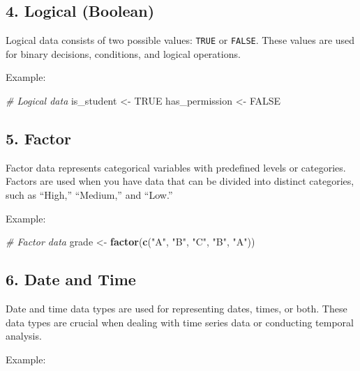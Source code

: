 \documentclass[
]{book}
\newenvironment{Shaded}{\begin{snugshade}}{\end{snugshade}}
\newcommand{\CommentTok}[1]{\textcolor[rgb]{0.56,0.35,0.01}{\textit{#1}}}
\newcommand{\ConstantTok}[1]{\textcolor[rgb]{0.56,0.35,0.01}{#1}}
\newcommand{\FunctionTok}[1]{\textcolor[rgb]{0.13,0.29,0.53}{\textbf{#1}}}
\newcommand{\NormalTok}[1]{#1}
\newcommand{\OtherTok}[1]{\textcolor[rgb]{0.56,0.35,0.01}{#1}}
\newcommand{\StringTok}[1]{\textcolor[rgb]{0.31,0.60,0.02}{#1}}
\begin{document}
\hypertarget{logical-boolean}{%
\subsection{4. Logical (Boolean)}\label{logical-boolean}}

Logical data consists of two possible values: \texttt{TRUE} or \texttt{FALSE}. These values are used for binary decisions, conditions, and logical operations.

Example:

\begin{Shaded}
\begin{Highlighting}[]
\CommentTok{\# Logical data}
\NormalTok{is\_student }\OtherTok{\textless{}{-}} \ConstantTok{TRUE}
\NormalTok{has\_permission }\OtherTok{\textless{}{-}} \ConstantTok{FALSE}
\end{Highlighting}
\end{Shaded}

\hypertarget{factor}{%
\subsection{5. Factor}\label{factor}}

Factor data represents categorical variables with predefined levels or categories. Factors are used when you have data that can be divided into distinct categories, such as ``High,'' ``Medium,'' and ``Low.''

Example:

\begin{Shaded}
\begin{Highlighting}[]
\CommentTok{\# Factor data}
\NormalTok{grade }\OtherTok{\textless{}{-}} \FunctionTok{factor}\NormalTok{(}\FunctionTok{c}\NormalTok{(}\StringTok{"A"}\NormalTok{, }\StringTok{"B"}\NormalTok{, }\StringTok{"C"}\NormalTok{, }\StringTok{"B"}\NormalTok{, }\StringTok{"A"}\NormalTok{))}
\end{Highlighting}
\end{Shaded}

\hypertarget{date-and-time}{%
\subsection{6. Date and Time}\label{date-and-time}}

Date and time data types are used for representing dates, times, or both. These data types are crucial when dealing with time series data or conducting temporal analysis.

Example:
\end{document}

